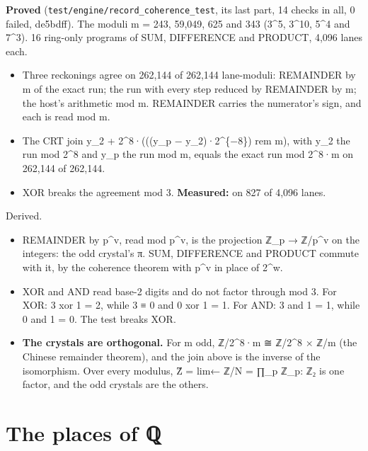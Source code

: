 \textbf{Proved} (\texttt{test/\allowbreak{}engine/\allowbreak{}record\_\allowbreak{}coherence\_\allowbreak{}test}, its last part, 14 checks in all, 0 failed, de5bdff). The moduli m = 243, 59,049, 625 and 343 (3\textasciicircum{}5, 3\textasciicircum{}10, 5\textasciicircum{}4 and 7\textasciicircum{}3). 16 ring-only programs of SUM, DIFFERENCE and PRODUCT, 4,096 lanes each.

\begin{itemize}
\item Three reckonings agree on 262,144 of 262,144 lane-moduli: REMAINDER by m of the exact run; the run with every step reduced by REMAINDER by m; the host's arithmetic mod m. REMAINDER carries the numerator's sign, and each is read mod m.
\item The CRT join y\_\allowbreak{}2 + 2\textasciicircum{}8·(((y\_\allowbreak{}p − y\_\allowbreak{}2)·2\textasciicircum{}\{−8\}) rem m), with y\_\allowbreak{}2 the run mod 2\textasciicircum{}8 and y\_\allowbreak{}p the run mod m, equals the exact run mod 2\textasciicircum{}8·m on 262,144 of 262,144.
\item XOR breaks the agreement mod 3. \textbf{Measured:} on 827 of 4,096 lanes.
\end{itemize}

Derived.

\begin{itemize}
\item REMAINDER by p\textasciicircum{}v, read mod p\textasciicircum{}v, is the projection ℤ\_\allowbreak{}p → ℤ/p\textasciicircum{}v on the integers: the odd crystal's π. SUM, DIFFERENCE and PRODUCT commute with it, by the coherence theorem with p\textasciicircum{}v in place of 2\textasciicircum{}w.
\item XOR and AND read base-2 digits and do not factor through mod 3. For XOR: 3 xor 1 = 2, while 3 ≡ 0 and 0 xor 1 = 1. For AND: 3 and 1 = 1, while 0 and 1 = 0. The test breaks XOR.
\item \textbf{The crystals are orthogonal.} For m odd, ℤ/2\textasciicircum{}8·m ≅ ℤ/2\textasciicircum{}8 × ℤ/m (the Chinese remainder theorem), and the join above is the inverse of the isomorphism. Over every modulus, Ẑ = lim← ℤ/N = ∏\_\allowbreak{}p ℤ\_\allowbreak{}p: ℤ₂ is one factor, and the odd crystals are the others.
\end{itemize}

\section{\texorpdfstring{The places of ℚ}{The places of ℚ}}

